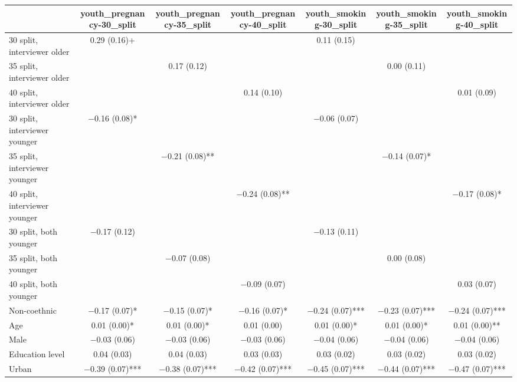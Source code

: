 \begin{table}[H]
\centering
\fontsize{7}{9}\selectfont
\begin{tabular}[t]{lcccccc}
\toprule
  & youth\_pregnancy-30\_split & youth\_pregnancy-35\_split & youth\_pregnancy-40\_split & youth\_smoking-30\_split & youth\_smoking-35\_split & youth\_smoking-40\_split\\
\midrule
30 split, interviewer older & \num{0.29} (\num{0.16})+ &  &  & \num{0.11} (\num{0.15}) &  & \\
35 split, interviewer older &  & \num{0.17} (\num{0.12}) &  &  & \num{0.00} (\num{0.11}) & \\
40 split, interviewer older &  &  & \num{0.14} (\num{0.10}) &  &  & \num{0.01} (\num{0.09})\\
30 split, interviewer younger & \num{-0.16} (\num{0.08})* &  &  & \num{-0.06} (\num{0.07}) &  & \\
35 split, interviewer younger &  & \num{-0.21} (\num{0.08})** &  &  & \num{-0.14} (\num{0.07})* & \\
40 split, interviewer younger &  &  & \num{-0.24} (\num{0.08})** &  &  & \num{-0.17} (\num{0.08})*\\
30 split, both younger & \num{-0.17} (\num{0.12}) &  &  & \num{-0.13} (\num{0.11}) &  & \\
35 split, both younger &  & \num{-0.07} (\num{0.08}) &  &  & \num{0.00} (\num{0.08}) & \\
40 split, both younger &  &  & \num{-0.09} (\num{0.07}) &  &  & \num{0.03} (\num{0.07})\\
Non-coethnic & \num{-0.17} (\num{0.07})* & \num{-0.15} (\num{0.07})* & \num{-0.16} (\num{0.07})* & \num{-0.24} (\num{0.07})*** & \num{-0.23} (\num{0.07})*** & \num{-0.24} (\num{0.07})***\\
Age & \num{0.01} (\num{0.00})* & \num{0.01} (\num{0.00})* & \num{0.01} (\num{0.00}) & \num{0.01} (\num{0.00})* & \num{0.01} (\num{0.00})* & \num{0.01} (\num{0.00})**\\
Male & \num{-0.03} (\num{0.06}) & \num{-0.03} (\num{0.06}) & \num{-0.03} (\num{0.06}) & \num{-0.04} (\num{0.06}) & \num{-0.04} (\num{0.06}) & \num{-0.04} (\num{0.06})\\
Education level & \num{0.04} (\num{0.03}) & \num{0.04} (\num{0.03}) & \num{0.03} (\num{0.03}) & \num{0.03} (\num{0.02}) & \num{0.03} (\num{0.02}) & \num{0.03} (\num{0.02})\\
Urban & \num{-0.39} (\num{0.07})*** & \num{-0.38} (\num{0.07})*** & \num{-0.42} (\num{0.07})*** & \num{-0.45} (\num{0.07})*** & \num{-0.44} (\num{0.07})*** & \num{-0.47} (\num{0.07})***\\

\end{tabular}
\end{table}
